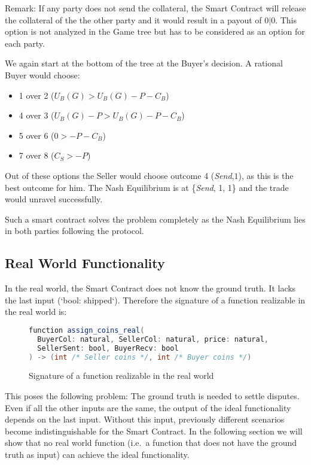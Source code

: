 \documentclass{cacthesis}
\begin{document}
Remark: If any party does not send the collateral, the Smart Contract will release the collateral of the the other party and it would result in a payout of $0|0$. This option is not analyzed in the Game tree but has to be considered as an option for each party.\newline

We again start at the bottom of the tree at the Buyer's decision. A rational Buyer would choose: 
\begin{itemize}
    \item 1 over 2 ($U_B(G) > U_B(G) - P - C_B$)
    \item 4 over 3 ($U_B(G) - P > U_B(G) - P - C_B $)
    \item 5 over 6 ($0> -P-C_B$)
    \item 7 over 8 ($C_S > -P$)
\end{itemize}
Out of these options the Seller would choose outcome 4 (\emph{Send},$1$), as this is the best outcome for him.
The Nash Equilibrium is at \{\emph{Send}, 1, 1\} and the trade would unravel successfully.\newline

Such a smart contract solves the problem completely as the Nash Equilibrium lies in both parties following the protocol.
\subsection{Real World Functionality}
In the real world, the Smart Contract does not know the ground truth. It lacks the last input (‘bool: shipped‘). Therefore the signature of a function realizable in the real world is:\newline
\begin{figure}[htb!]
\begin{lstlisting}[language=java]
function assign_coins_real(
  BuyerCol: natural, SellerCol: natural, price: natural,
  SellerSent: bool, BuyerRecv: bool
) -> (int /* Seller coins */, int /* Buyer coins */)
\end{lstlisting}
 \centering
    \caption{Signature of a function realizable in the real world}
    \label{fig:real_world_function_signature}
\end{figure}

This poses the following problem: The ground truth is needed to settle disputes. Even if all the other inputs are the same, the output of the ideal functionality depends on the last input. Without this input, previously different scenarios become indistinguishable for the Smart Contract. In the following section we will show that no real world function (i.e.\ a function that does not have the ground truth as input) can achieve the ideal functionality.\newline
\end{document}
